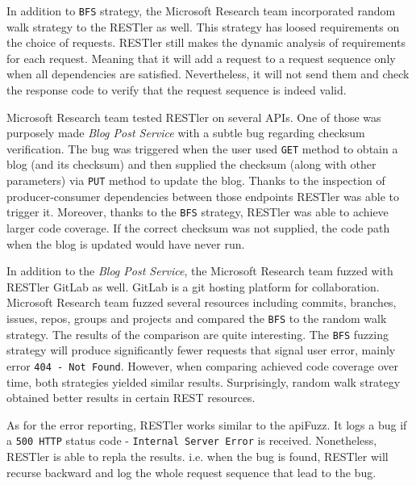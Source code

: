 In addition to \texttt{BFS} strategy, the Microsoft Research team incorporated random walk strategy to the RESTler as well. This strategy has loosed requirements on the choice of requests. RESTler still makes the dynamic analysis of requirements for each request. Meaning that it will add a request to a request sequence only when all dependencies are satisfied. Nevertheless, it will not send them and check the response code to verify that the request sequence is indeed valid.

Microsoft Research team tested RESTler on several APIs. One of those was purposely made \textit{Blog Post Service} with a subtle bug regarding checksum verification. The bug was triggered when the user used \texttt{GET} method to obtain a blog (and its checksum) and then supplied the checksum (along with other parameters) via \texttt{PUT} method to update the blog. Thanks to the inspection of producer-consumer dependencies between those endpoints RESTler was able to trigger it. Moreover, thanks to the \texttt{BFS} strategy, RESTler was able to achieve larger code coverage. If the correct checksum was not supplied, the code path when the blog is updated would have never run.

In addition to the \textit{Blog Post Service}, the Microsoft Research team fuzzed with RESTler GitLab as well. GitLab is a git hosting platform for collaboration. Microsoft Research team fuzzed several resources including commits, branches, issues, repos, groups and projects and compared the \texttt{BFS} to the random walk strategy. The results of the comparison are quite interesting. The \texttt{BFS} fuzzing strategy will produce significantly fewer requests that signal user error, mainly error \texttt{404 - Not Found}. However, when comparing achieved code coverage over time, both strategies yielded similar results. Surprisingly, random walk strategy obtained better results in certain REST resources.

As for the error reporting, RESTler works similar to the apiFuzz. It logs a bug if a \texttt{500 HTTP} status code - \texttt{Internal Server Error} is received. Nonetheless, RESTler is able to repla the results. i.e. when the bug is found, RESTler will recurse backward and log the whole request sequence that lead to the bug.

